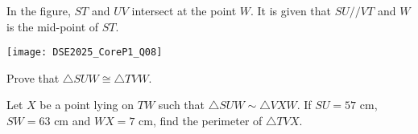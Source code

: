 
In the figure, $ST$ and $UV$ intersect at the point $W$. It is given that $SU//VT$ and $W$ is the mid-point of $ST$.


\begin{center}
\texttt{[image: DSE2025\_CoreP1\_Q08]}
\end{center}


\begin{enumx}[label=(\alph*)]
	\item Prove that $\triangle SUW \cong \triangle TVW$.
    \item Let $X$ be a point lying on $TW$ such that $\triangle SUW \sim \triangle VXW$. If $SU=57$ cm, $SW=63$ cm and $WX=7$ cm, find the perimeter of $\triangle TVX$.
\end{enumx}




